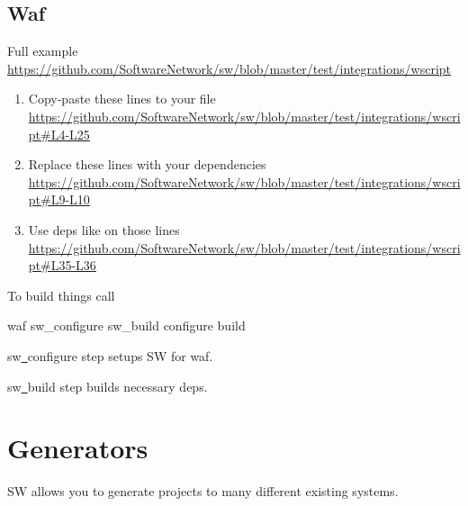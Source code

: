 \subsection{Waf}

Full example\\
\url{https://github.com/SoftwareNetwork/sw/blob/master/test/integrations/wscript}

\begin{enumerate}
\item
Copy-paste these lines to your file \url{https://github.com/SoftwareNetwork/sw/blob/master/test/integrations/wscript#L4-L25}

\item
Replace these lines with your dependencies \url{https://github.com/SoftwareNetwork/sw/blob/master/test/integrations/wscript#L9-L10}

\item
Use deps like on those lines \url{https://github.com/SoftwareNetwork/sw/blob/master/test/integrations/wscript#L35-L36}

\end{enumerate}

To build things call

\begin{command}
waf sw_configure sw_build configure build
\end{command}

sw\underline\ configure step setups SW for waf.

sw\underline\ build step builds necessary deps.





\section{Generators}

SW allows you to generate projects to many different existing systems.

